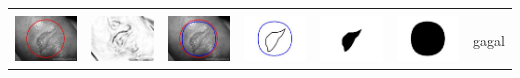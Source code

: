 \begin{table}[H]
\begin{tabular}{|m{0.7in}|m{0.7in}|m{0.7in}|m{0.7in}|m{0.7in}|m{0.7in}|m{0.7in}|}
		&  &  & & & &  \\
		\includegraphics[width=0.7in]{dataset/dataset_3/luka_kuning/ready/18_integer_init.jpg}&
		\includegraphics[width=0.7in]{dataset/dataset_3/luka_kuning/ready/18_integer_ext.jpg}&
		\includegraphics[width=0.7in]{dataset/dataset_3/luka_kuning/ready/18_integer_result.jpg}&
		\includegraphics[width=0.7in]{dataset/dataset_3/luka_kuning/ready/18_gt_r_integer.jpg}&
		\includegraphics[width=0.7in]{dataset/dataset_3/luka_kuning/ready/18_r.jpg}&
		\includegraphics[width=0.7in]{dataset/dataset_3/luka_kuning/ready/18_integer_r.jpg}&
		gagal\\
		\hline
		

\end{tabular}
\end{table}
